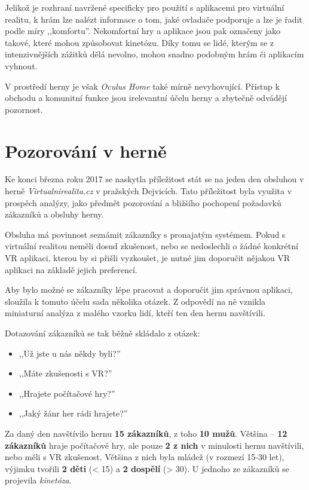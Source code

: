 Jelikož je rozhraní navržené specificky pro použití s aplikacemi pro
virtuální realitu, k hrám lze nalézt informace o tom, jaké ovladače
podporuje a lze je řadit podle míry ,,komfortu''. Nekomfortní hry a aplikace jsou
pak označeny jako takové, které mohou způsobovat kinetózu. Díky tomu se
lidé, kterým se z intenzivnějších zážitků dělá nevolno, mohou snadno podobným
hrám či aplikacím vyhnout.

V prostředí herny je však \emph{Oculus Home} také mírně nevyhovující.
Přístup k obchodu a komunitní funkce jsou irelevantní účelu herny a
zbytečně odvádějí pozornost.

\section{Pozorování v herně}\label{pozorovuxe1nuxed-v-hernux11b}

Ke konci března roku 2017 se naskytla příležitost stát se na jeden den
obsluhou v herně \emph{Virtualnirealita.cz} v pražských Dejvicích. Tato
příležitost byla využita v prospěch analýzy, jako předmět pozorování a
bližšího pochopení požadavků zákazníků a obsluhy herny.

Obsluha má povinnost seznámit zákazníky s pronajatým
systémem. Pokud s virtuální realitou neměli dosud zkušenost, nebo se
nedoslechli o žádné konkrétní VR aplikaci, kterou by si přišli
vyzkoušet, je nutné jim doporučit nějakou VR aplikaci na základě jejich preferencí.

Aby bylo možné se zákazníky lépe pracovat a doporučit jim správnou
aplikaci, sloužila k tomuto účelu sada několika otázek. Z odpovědí na ně vznikla
miniaturní analýza z malého vzorku lidí, kteří ten den hernu navštívili.

Dotazování zákazníků se tak běžně skládalo z otázek: 

\begin{itemize}
\tightlist
\item
,,Už jste u nás
někdy byli?''
\item
  ,,Máte zkušenosti s VR?''
\item
  ,,Hrajete počítačové hry?''
\item
  ,,Jaký žánr her rádi hrajete?''
\end{itemize}

Za daný den navštívilo hernu \textbf{15 zákazníků}, z toho \textbf{10
mužů}. Většina -- \textbf{12 zákazníků} hraje počítačové hry, ale pouze
\textbf{2 z nich} v minulosti hernu navštívili, nebo měli s VR
zkušenost. Většina z nich byla mládež (v rozmezí 15-30 let), výjimku
tvořili \textbf{2 děti} (\textless{} 15) a \textbf{2 dospělí}
(\textgreater{} 30). U jednoho ze zákazníků se projevila
\emph{kinetóza}.


